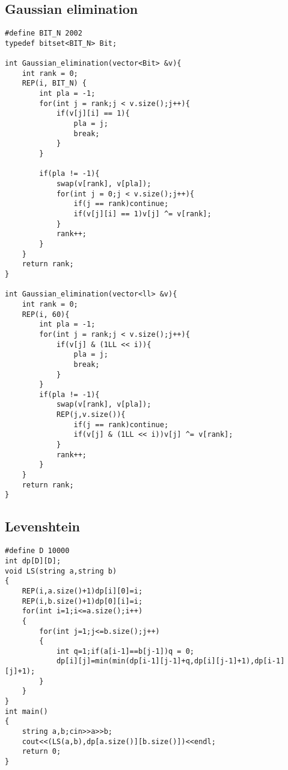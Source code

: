 \documentclass[10pt]{article}
\begin{document}
\subsection{Gaussian elimination}
\begin{lstlisting}
#define BIT_N 2002
typedef bitset<BIT_N> Bit;

int Gaussian_elimination(vector<Bit> &v){
    int rank = 0;
    REP(i, BIT_N) {
        int pla = -1;
        for(int j = rank;j < v.size();j++){
            if(v[j][i] == 1){
                pla = j;
                break;
            }
        }

        if(pla != -1){
            swap(v[rank], v[pla]);
            for(int j = 0;j < v.size();j++){
                if(j == rank)continue;
                if(v[j][i] == 1)v[j] ^= v[rank];
            }
            rank++;
        }
    }
    return rank;
}

int Gaussian_elimination(vector<ll> &v){
	int rank = 0;
	REP(i, 60){
		int pla = -1;
		for(int j = rank;j < v.size();j++){
			if(v[j] & (1LL << i)){
				pla = j;
				break;
			}
		}
		if(pla != -1){
			swap(v[rank], v[pla]);
			REP(j,v.size()){
				if(j == rank)continue;
				if(v[j] & (1LL << i))v[j] ^= v[rank];
			}
			rank++;
		}
	}
    return rank;
}
\end{lstlisting}

\subsection{Levenshtein}
\begin{lstlisting}
#define D 10000
int dp[D][D];
void LS(string a,string b)
{
	REP(i,a.size()+1)dp[i][0]=i;
	REP(i,b.size()+1)dp[0][i]=i;
	for(int i=1;i<=a.size();i++)
	{
		for(int j=1;j<=b.size();j++)
		{
			int q=1;if(a[i-1]==b[j-1])q = 0;
			dp[i][j]=min(min(dp[i-1][j-1]+q,dp[i][j-1]+1),dp[i-1][j]+1);
		}
	}
}
int main()
{
	string a,b;cin>>a>>b;
	cout<<(LS(a,b),dp[a.size()][b.size()])<<endl;
	return 0;
}
\end{lstlisting}
\end{document}
